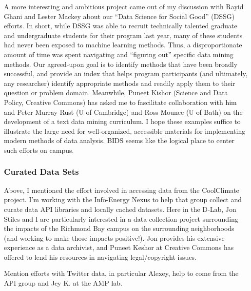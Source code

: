 A more interesting and ambitious project came out of my discussion with Rayid
Ghani and Lester Mackey about our “Data Science for Social Good” (DSSG) efforts.
In short, while DSSG was able to recruit technically talented graduate and
undergraduate students for their program last year, many of these students had
never been exposed to machine learning methods. Thus, a disproportionate amount
of time was spent navigating and “figuring out” specific data mining methods.
Our agreed-upon goal is to identify methods that have been broadly successful,
and provide an index that helps program participants (and ultimately, any
researcher) identify appropriate methods and readily apply them to their
question or problem domain. Meanwhile, Puneet Kishor (Science and Data Policy,
Creative Commons) has asked me to fascilitate collaboration with him and Peter
Murray-Rust (U of Cambridge) and Ross Mounce (U of Bath) on the development of a
text data mining curriculum.
I hope these examples
suffice to illustrate the large need for well-organized, accessible materials
for implementing modern methods of data analysis. BIDS seems like the logical
place to center such efforts on campus.

\subsubsection*{Curated Data Sets}

Above, I mentioned the effort involved in accessing data from the CoolClimate
project. I'm working with the Info-Energy Nexus to help that group collect and
curate data API libraries and locally cached datasets. Here in the D-Lab, Jon
Stiles and I are particularly interested in a data collection project
surrounding the impacts of the Richmond Bay campus on the surrounding
neighborhoods (and working to make those impacts positive!). Jon provides his
extensive experience as a data archivist, and Puneet Keshor at Creative Commons
has offered to lend his resources in navigating legal/copyright issues.

Mention efforts with Twitter data, in particular Alexey, help to come from the
API group and Jey K. at the AMP lab.

